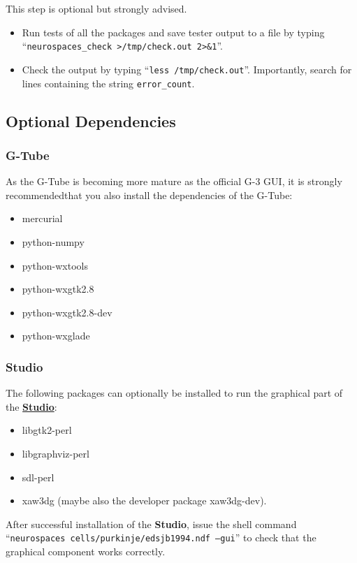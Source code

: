 \documentclass[12pt]{article}
\begin{document}
This step is optional but strongly advised.

\begin{itemize}      
   \item[] Run tests of all the packages and save tester output to a file  by typing ``{\tt neurospaces\_check >/tmp/check.out 2>\&1}''.
   \item[] Check the output by typing ``{\tt less /tmp/check.out}''. Importantly, search for lines containing the string {\tt error\_count}.
\end{itemize}
    

\subsection*{Optional Dependencies}

\subsubsection*{G-Tube}

As the G-Tube is becoming more mature as the official G-3 GUI, it is
strongly recommendedthat you also install the dependencies of the G-Tube:

\begin{itemize}
\item mercurial
\item python-numpy
\item python-wxtools
\item python-wxgtk2.8
\item python-wxgtk2.8-dev
\item python-wxglade
\end{itemize}

\subsubsection*{Studio}

The following packages can optionally be installed to run the
graphical part of the \href{../studio/studio.tex}{\bf Studio}:
\begin{itemize}
\item libgtk2-perl
\item libgraphviz-perl
\item sdl-perl
\item xaw3dg (maybe also the developer package xaw3dg-dev).
\end{itemize}
After successful installation of the {\bf Studio}, issue the
shell command ``{\tt neurospaces cells/purkinje/edsjb1994.ndf --gui}'' to check that 
the graphical component works correctly.
\end{document}
